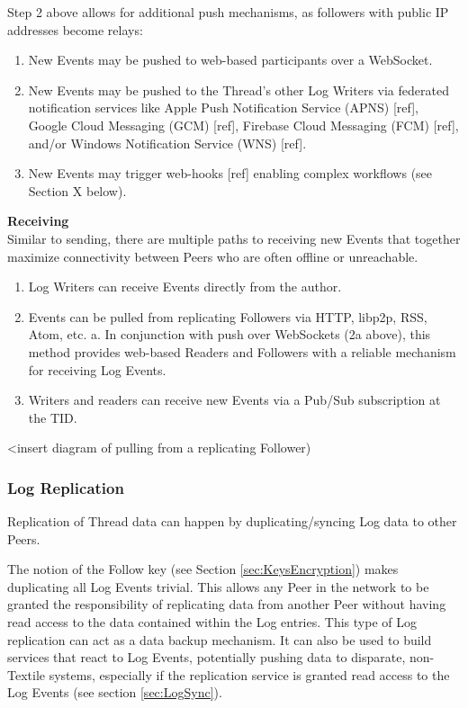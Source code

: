 \documentclass{comjnl}
\begin{document}
Step 2 above allows for additional push mechanisms, as followers with public IP addresses become relays:

\begin{enumerate}
\item \label{Perf1}New Events may be pushed to web-based participants over a WebSocket.
\item \label{Perf2}New Events may be pushed to the Thread’s other Log Writers via federated notification services like Apple Push Notification Service (APNS) [ref], Google Cloud Messaging (GCM) [ref], Firebase Cloud Messaging (FCM) [ref], and/or Windows Notification Service (WNS) [ref].
\item \label{Perf3} New Events may trigger web-hooks [ref] enabling complex workflows (see Section X below).\\
\end{enumerate}

\textbf{Receiving} \\

Similar to sending, there are multiple paths to receiving new Events that together maximize connectivity between Peers who are often offline or unreachable.

\begin{enumerate}
\item \label{Perf1}Log Writers can receive Events directly from the author.
\item \label{Perf2} Events can be pulled from replicating Followers via HTTP, libp2p, RSS, Atom, etc.
    a. In conjunction with push over WebSockets (2a above), this method provides web-based Readers and Followers with a reliable mechanism for receiving Log Events.
\item \label{Perf3} Writers and readers can receive new Events via a Pub/Sub subscription at the TID.
\end{enumerate}

<insert diagram of pulling from a replicating Follower)

\subsubsection{Log Replication}

Replication of Thread data can happen by duplicating/syncing Log data to other Peers.

The notion of the Follow key (see Section  \ref{sec:KeysEncryption}) makes duplicating all Log Events trivial. This allows any Peer in the network to be granted the responsibility of replicating data from another Peer without having read access to the data contained within the Log entries. This type of Log replication can act as a data backup mechanism. It can also be used to build services that react to Log Events, potentially pushing data to disparate, non-Textile systems, especially if the replication service is granted read access to the Log Events (see section  \ref{sec:LogSync}).
\end{document}
